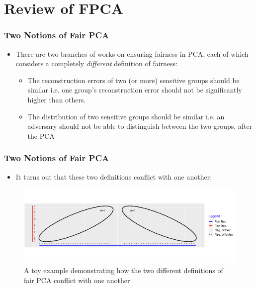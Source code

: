 \documentclass{beamer}
\begin{document}
	
	\section{Review of FPCA}
	\begin{frame}
	\frametitle{Two Notions of Fair PCA}
		\begin{itemize}
			\item There are two branches of works on ensuring fairness in PCA, each of which considers a completely {\it different} definition of fairness:
			\begin{itemize}
				\item The reconstruction errors of two (or more) sensitive groups should be similar i.e. one group's reconstruction error should not be significantly higher than others. \cite{SamadiTMSV18, TantipongpipatS19}
				
				\item The distribution of two sensitive groups should be similar i.e. an adversary should not be able to distinguish between the two groups, after the PCA \cite{OA19, Lee21}
			\end{itemize}
		\end{itemize}
	\end{frame}

	\begin{frame}
	\frametitle{Two Notions of Fair PCA}
		\begin{itemize}
			\item It turns out that these two definitions conflict with one another:
		\end{itemize}
		\begin{figure}
			\centering
			\includegraphics[width=\linewidth]{figures/comp.png}
			\caption{A toy example demonstrating how the two different definitions of fair PCA conflict with one another \cite{Lee21}}
			\label{fig:comparison1}
		\end{figure}
	\end{frame}
\end{document}
